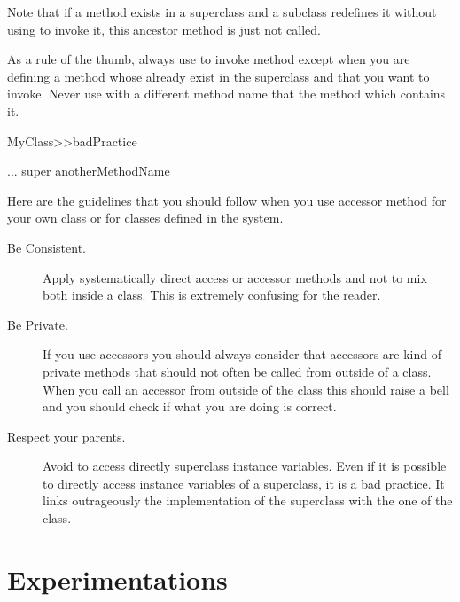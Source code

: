 Note that if a method exists in a superclass and a subclass redefines
it without using \super to invoke it, this ancestor method is just not
called.


As a rule of the thumb, always use \self to invoke method except when
you are defining a method whose already exist in the superclass and
that you want to invoke. Never use \super with a different method name
that the method which contains it. 

\begin{method}
MyClass>>badPractice

   ... super anotherMethodName
\end{method}









Here are the guidelines that you should follow when you use accessor method for your own class or for classes defined in the system. 
\begin{description}
\item[Be Consistent.] Apply systematically direct access or
accessor methods and not to mix both inside a class. This is extremely
confusing for the reader.

\item[Be Private.]
If you use accessors you should always consider that accessors are
kind of private methods that should not often be called from outside
of a class. When you call an accessor from outside of the class this
should raise a bell and you should check if what you are doing is correct.
\item[Respect your parents.]
Avoid to access directly superclass instance variables.  Even if it is
possible to directly access instance variables of a superclass, it is
a bad practice. It links outrageously the implementation of the
superclass with the one of the class.
\end{description}





\section{Experimentations}

